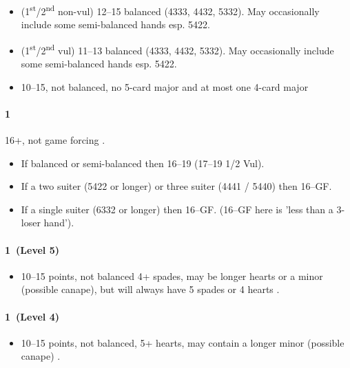 \documentclass[a4paper,14pt]{extarticle}
\begin{document}
\begin{itemize}
\item (1\textsuperscript{st}/2\textsuperscript{nd} non-vul) 12--15 balanced (4333, 4432, 5332). May occasionally include some semi-balanced hands esp. 5422.
\item (1\textsuperscript{st}/2\textsuperscript{nd} vul) 11--13 balanced (4333, 4432, 5332). May occasionally include some semi-balanced hands esp. 5422.

\item 10--15, not balanced, no 5-card major and at most one 4-card major
\end{itemize}

\paragraph{1\diamonds}

16+, not game forcing . 
\begin{itemize}
\item If balanced or semi-balanced then 16--19 (17--19 1/2 Vul). 
\item If a two suiter (5422 or longer) or three suiter (4441 / 5440) then 16--GF. 
\item If a single suiter (6332 or longer) then 16--GF. (16--GF here is 'less than a 3-loser hand').
\end{itemize}

{\it

\paragraph{1\hearts~(Level 5)}

\begin{itemize}
\item 10--15 points, not balanced 4+ spades, may be longer hearts or a minor (possible canape), but will always have 5 spades or 4 hearts .
\end{itemize}

}

{\color{CadetBlue}

\paragraph{1\hearts~(Level 4)}

\begin{itemize}
\item 10--15 points, not balanced, 5+ hearts, may contain a longer minor (possible canape) .
\end{itemize}
}
\end{document}
